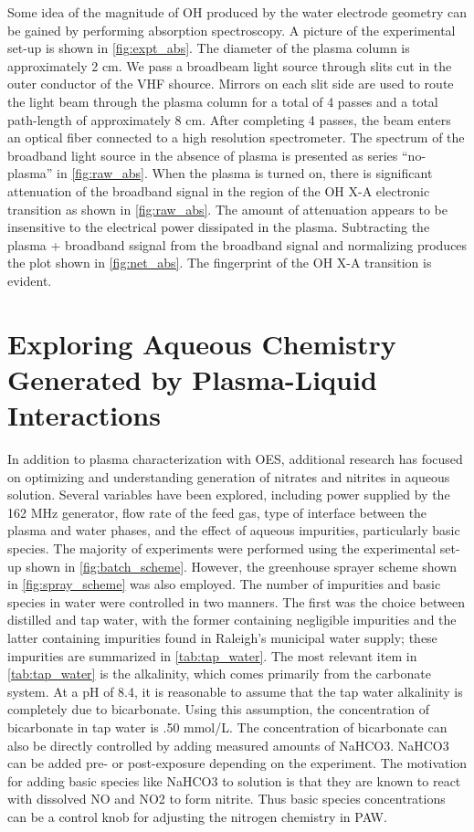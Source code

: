 Some idea of the magnitude of OH produced by the water electrode geometry can be gained by performing absorption spectroscopy. A picture of the experimental set-up is shown in \cref{fig:expt_abs}. The diameter of the plasma column is approximately 2 cm. We pass a broadbeam light source through slits cut in the outer conductor of the VHF shource. Mirrors on each slit side are used to route the light beam through the plasma column for a total of 4 passes and a total path-length of approximately 8 cm. After completing 4 passes, the beam enters an optical fiber connected to a high resolution spectrometer. The spectrum of the broadband light source in the absence of plasma is presented as series ``no-plasma'' in \cref{fig:raw_abs}. When the plasma is turned on, there is significant attenuation of the broadband signal in the region of the OH X-A electronic transition as shown in \cref{fig:raw_abs}. The amount of attenuation appears to be insensitive to the electrical power dissipated in the plasma. Subtracting the plasma + broadband ssignal from the broadband signal and normalizing produces the plot shown in \cref{fig:net_abs}. The fingerprint of the OH X-A transition is evident.


\section{Exploring Aqueous Chemistry Generated by Plasma-Liquid Interactions}
\label{sec:aq_chem}

In addition to plasma characterization with OES, additional research has focused on optimizing and understanding generation of nitrates and nitrites in aqueous solution.  Several variables have been explored, including power supplied by the 162 MHz generator, flow rate of the feed gas, type of interface between the plasma and water phases, and the effect of aqueous impurities, particularly basic species. The majority of experiments were performed using the experimental set-up shown in \cref{fig:batch_scheme}.  However, the greenhouse sprayer scheme shown in \cref{fig:spray_scheme} was also employed.  The number of impurities and basic species in water were controlled in two manners.  The first was the choice between distilled and tap water, with the former containing negligible impurities and the latter containing impurities found in Raleigh's municipal water supply; these impurities are summarized in \cref{tab:tap_water}.  The most relevant item in \cref{tab:tap_water} is the alkalinity, which comes primarily from the carbonate system.  At a pH of 8.4, it is reasonable to assume that the tap water alkalinity is completely due to bicarbonate. \cite{benjamin2014water} Using this assumption, the concentration of bicarbonate in tap water is .50 mmol/L.  The concentration of bicarbonate can also be directly controlled by adding measured amounts of NaHCO3.   NaHCO3 can be added pre- or post-exposure depending on the experiment.  The motivation for adding basic species like NaHCO3 to solution is that they are known to react with dissolved NO and NO2 to form nitrite. \cite{greenwood1984chemistry} Thus basic species concentrations can be a control knob for adjusting the nitrogen chemistry in PAW.

